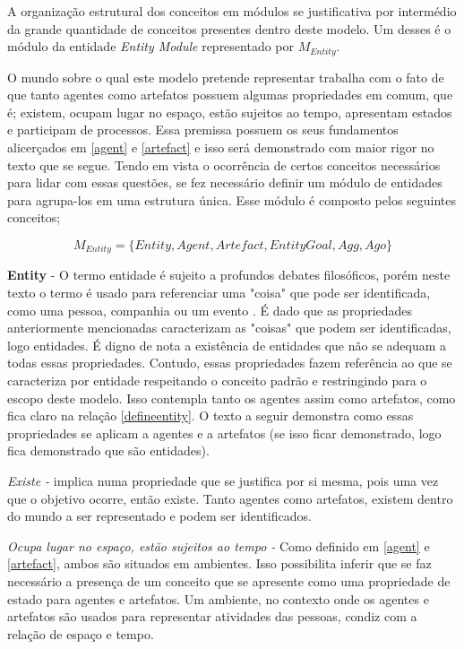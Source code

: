 A organização estrutural dos conceitos em módulos se justificativa por intermédio da grande quantidade de conceitos presentes dentro deste modelo. Um desses é o módulo da entidade \textit{Entity Module} representado por $M_{Entity}$. 

O mundo sobre o qual este modelo pretende representar trabalha com o fato de que tanto agentes como artefatos possuem algumas propriedades em comum, que é; existem, ocupam lugar no espaço, estão sujeitos ao tempo, apresentam estados e participam de processos. Essa premissa possuem os seus fundamentos alicerçados em \ref{agent} e \ref{artefact} e isso será demonstrado com maior rigor no texto que se segue. Tendo em vista o ocorrência de certos conceitos necessários para lidar com essas questões, se fez necessário definir um módulo de entidades para agrupa-los em uma estrutura única. Esse módulo é composto pelos seguintes conceitos;

\begin{equation} 
M_{Entity} = \{ Entity, Agent, Artefact, EntityGoal, Agg, Ago\}
\end{equation}\label{modent}

\textbf{Entity} - O termo entidade é sujeito a profundos debates filosóficos, porém neste texto o termo é usado para referenciar uma "coisa" que pode ser identificada, como uma pessoa, companhia ou um evento \cite{entity}. É dado que as propriedades anteriormente mencionadas caracterizam as "coisas" que podem ser identificadas, logo entidades. É digno de nota a existência de entidades que não se adequam a todas essas propriedades. Contudo, essas propriedades fazem referência ao que se caracteriza por entidade respeitando o conceito padrão \cite{entity} e restringindo para o escopo deste modelo. Isso contempla tanto os agentes assim como artefatos, como fica claro na relação \ref{defineentity}. O texto a seguir demonstra como essas propriedades se aplicam a agentes e a artefatos (se isso ficar demonstrado, logo fica demonstrado que são entidades).

\textit{Existe -} implica numa propriedade que se justifica por si mesma, pois uma vez que o objetivo ocorre, então existe. Tanto agentes como artefatos, existem dentro do mundo a ser representado e podem ser identificados.  

\textit{Ocupa lugar no espaço, estão sujeitos ao tempo - } Como definido em \ref{agent} e \ref{artefact}, ambos são situados em ambientes. 
Isso possibilita inferir que se faz necessário a presença de um conceito que se apresente como uma propriedade de estado para agentes e artefatos. Um ambiente, no contexto onde os agentes e artefatos são usados para representar atividades das pessoas, condiz com a relação de espaço e tempo. 

